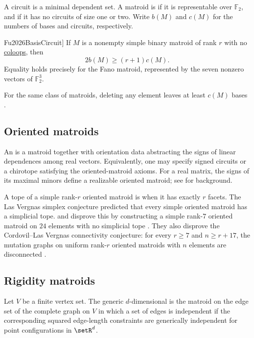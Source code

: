 A circuit is a minimal dependent set. A matroid is  if it is
representable over $\mathbb{F}_2$, and  if it has no circuits
of size one or two. Write $b(M)$ and $c(M)$ for the
numbers of bases and circuits, respectively.

\begin{theorem}[\cite[Thm.~1.1]{Fu2026BasisCircuit}]
If $M$ is a nonempty simple binary matroid of rank $r$ with no
\hyperref[matroidColoop]{coloops}, then
\[
 2b(M)\geq(r+1)c(M).
\]
Equality holds precisely for the Fano matroid, represented by the seven
nonzero vectors of $\mathbb{F}_2^3$.
\end{theorem}

For the same class of matroids, deleting any element leaves at least
$c(M)$ bases \cite[Thm.~1.2]{Fu2026BasisCircuit}.

\subsection[orientedMatroid]{Oriented matroids}

An  is a matroid together with orientation data
abstracting the signs of linear dependences among real vectors.  Equivalently,
one may specify signed circuits or a chirotope satisfying the oriented-matroid
axioms.  For a real matrix, the signs of its maximal minors define a realizable
oriented matroid; see \cite{Oxley2011} for background.

A tope of a simple rank-$r$ oriented matroid is  when it
has exactly $r$ facets.  The Las Vergnas simplex conjecture predicted that
every simple oriented matroid has a simplicial tope.   and
 disprove this by constructing a simple rank-$7$ oriented
matroid on $24$ elements with no simplicial tope
\cite[Thm.~1.2]{GuKnauer2026x}.  They also disprove the Cordovil--Las Vergnas
connectivity conjecture: for every $r\geq7$ and $n\geq r+17$, the mutation
graphs on uniform rank-$r$ oriented matroids with $n$ elements are
disconnected \cite[Thm.~1.6]{GuKnauer2026x}.


\subsection[rigidityMatroid]{Rigidity matroids}

Let $V$ be a finite vertex set.  The generic $d$-dimensional
 is the matroid on the edge set of the complete graph
on $V$ in which a set of edges is independent if the corresponding squared
edge-length constraints are generically independent for point configurations
in $\setR^d$.



